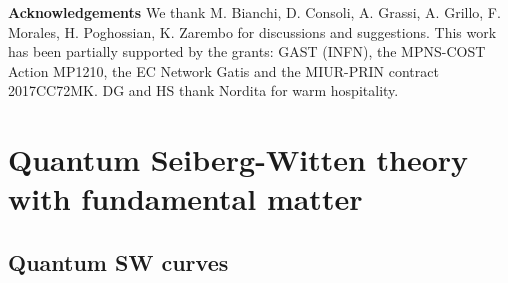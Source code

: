 \documentclass[11pt,a4paper]{elsarticle}
\numberwithin{figure}{section}
\numberwithin{table}{section}
\begin{document}
\vspace{10mm}
{\bf Acknowledgements} We thank M. Bianchi, D. Consoli, A. Grassi, A. Grillo, F. Morales, H. Poghossian, K. Zarembo for discussions and suggestions. This work has been partially supported by the grants: GAST (INFN), the MPNS-COST Action MP1210, the EC Network Gatis and the MIUR-PRIN contract 2017CC72MK. DG and HS thank Nordita for warm hospitality.
\normalsize



\newpage

\appendix 

\section{Quantum Seiberg-Witten theory with fundamental matter} \label{sec:qSWNf}


\subsection{Quantum SW curves}
\label{sec:qSWNf1}
\end{document}
